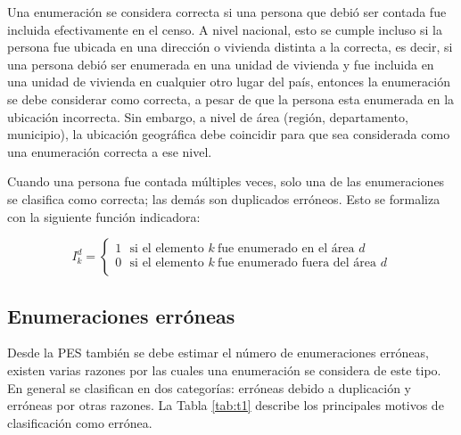 \documentclass[
  12pt,
]{book}
\begin{document}
Una enumeración se considera correcta si una persona que debió ser contada fue incluida efectivamente en el censo. A nivel nacional, esto se cumple incluso si la persona fue ubicada en una dirección o vivienda distinta a la correcta, es decir, si una persona debió ser enumerada en una unidad de vivienda y fue incluida en una unidad de vivienda en cualquier otro lugar del país, entonces la enumeración se debe considerar como correcta, a pesar de que la persona esta enumerada en la ubicación incorrecta. Sin embargo, a nivel de área (región, departamento, municipio), la ubicación geográfica debe coincidir para que sea considerada como una enumeración correcta a ese nivel.

Cuando una persona fue contada múltiples veces, solo una de las enumeraciones se clasifica como correcta; las demás son duplicados erróneos. Esto se formaliza con la siguiente función indicadora:

\[I_k^{d} = \begin{cases} 
1 \ \ \ \text{si el elemento } k \ \text{fue enumerado en el área } d \\
0 \ \ \ \text{si el elemento } k \ \text{fue enumerado fuera del área } d \\
\end{cases} \]

\subsection{Enumeraciones erróneas}\label{enumeraciones-erruxf3neas}

Desde la PES también se debe estimar el número de enumeraciones erróneas, existen varias razones por las cuales una enumeración se considera de este tipo. En general se clasifican en dos categorías: erróneas debido a duplicación y erróneas por otras razones. La Tabla \ref{tab:t1} describe los principales motivos de clasificación como errónea.
\end{document}
